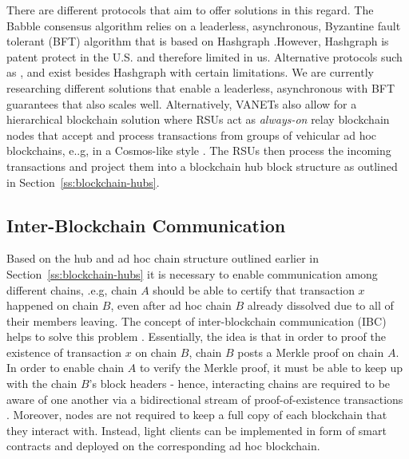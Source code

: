 \documentclass{llncs}
\begin{document}
{			There are different protocols that aim to offer solutions in this regard. The Babble consensus algorithm \cite{bibid} relies on a leaderless, asynchronous, Byzantine fault tolerant (BFT) algorithm that is based on Hashgraph \cite{hashgraphWhitepaper}.However, Hashgraph is patent protect in the U.S. and therefore limited in us. Alternative protocols such as \cite{miller2016honey}, \cite{bibid} and \cite{bibid} exist besides Hashgraph with certain limitations. We are currently researching different solutions that enable a leaderless, asynchronous with BFT guarantees that also scales well. Alternatively, VANETs also allow for a hierarchical blockchain solution where RSUs act as \textit{always-on} relay blockchain nodes that accept and process transactions from groups of vehicular ad hoc blockchains, e..g, in a Cosmos-like style \cite{cosmosWhitepaper}. The RSUs then process the incoming transactions and project them into a blockchain hub block structure as outlined in Section~\ref{ss:blockchain-hubs}.
		
				
		\subsection{Inter-Blockchain Communication}
			\label{ss:inter-blockchain-communication}
			
			Based on the hub and ad hoc chain structure outlined earlier in Section~\ref{ss:blockchain-hubs} it is necessary to enable communication among different chains, .e.g, chain $A$ should be able to certify that transaction $x$ happened on chain $B$, even after ad hoc chain $B$ already dissolved due to all of their members leaving. The concept of inter-blockchain communication (IBC) helps to solve this problem \cite{monetWhitepaper}\cite{chen2017inter}\cite{cosmosWhitepaper}. Essentially, the idea is that in order to proof the existence of transaction $x$ on chain $B$, chain $B$ posts a Merkle proof on chain $A$. In order to enable chain $A$ to verify the Merkle proof, it must be able to keep up with the chain $B$'s block headers - hence, interacting chains are required to be aware of one another via a bidirectional stream of proof-of-existence transactions \cite{cosmosWhitepaper}. Moreover, nodes are not required to keep a full copy of each blockchain that they interact with. Instead, light clients can be implemented in form of smart contracts and deployed on the corresponding ad hoc blockchain.	

}
\end{document}
